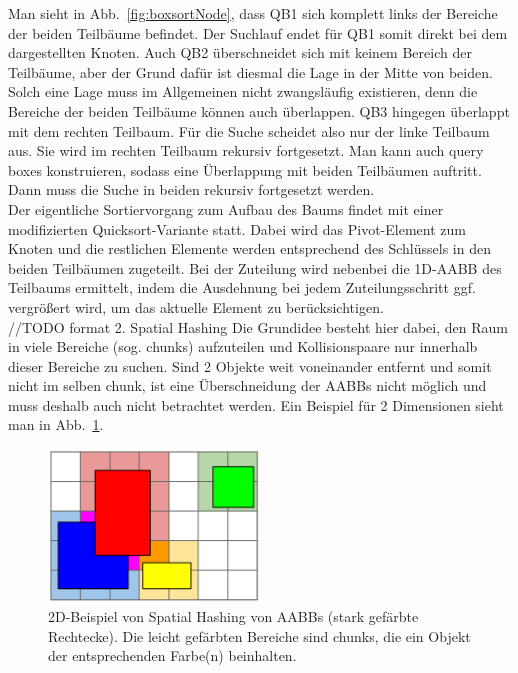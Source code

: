 Man sieht in Abb.~\ref{fig:boxsortNode}, dass QB1 sich komplett links der Bereiche der beiden Teilbäume befindet. Der Suchlauf endet für QB1 somit direkt bei dem dargestellten Knoten. Auch QB2 überschneidet sich mit keinem Bereich der Teilbäume, aber der Grund dafür ist diesmal die Lage in der Mitte von beiden. Solch eine Lage muss im Allgemeinen nicht zwangsläufig existieren, denn die Bereiche der beiden Teilbäume können auch überlappen. QB3 hingegen überlappt mit dem rechten Teilbaum. Für die Suche scheidet also nur der linke Teilbaum aus. Sie wird im rechten Teilbaum rekursiv fortgesetzt. Man kann auch query boxes konstruieren, sodass eine Überlappung mit beiden Teilbäumen auftritt. Dann muss die Suche in beiden rekursiv fortgesetzt werden.\\
Der eigentliche Sortiervorgang zum Aufbau des Baums findet mit einer modifizierten Quicksort-Variante statt. Dabei wird das Pivot-Element zum Knoten und die restlichen Elemente werden entsprechend des Schlüssels in den beiden Teilbäumen zugeteilt. Bei der Zuteilung wird nebenbei die 1D-AABB des Teilbaums ermittelt, indem die Ausdehnung bei jedem Zuteilungsschritt ggf. vergrößert wird, um das aktuelle Element zu berücksichtigen.\\


//TODO format
2. Spatial Hashing
Die Grundidee besteht hier dabei, den Raum in viele Bereiche (sog. chunks) aufzuteilen und Kollisionspaare nur innerhalb dieser Bereiche zu suchen. Sind 2 Objekte weit voneinander entfernt und somit nicht im selben chunk, ist eine Überschneidung der AABBs nicht möglich und muss deshalb auch nicht betrachtet werden. Ein Beispiel für 2 Dimensionen sieht man in Abb.~\ref{fig:spatialHashing}.

\begin{figure}
    \centering
    \includegraphics[width=0.5\textwidth]{./res/spatialHashingAABB.png}
    \caption{2D-Beispiel von Spatial Hashing von AABBs (stark gefärbte Rechtecke). Die leicht gefärbten Bereiche sind chunks, die ein Objekt der entsprechenden Farbe(n) beinhalten.}
    \label{fig:spatialHashing}
\end{figure}

